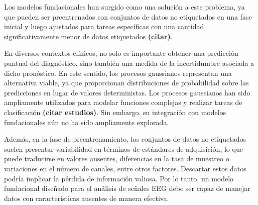 Los modelos fundacionales han surgido como una solución a este problema, ya que pueden ser preentrenados con conjuntos de datos no etiquetados en una fase inicial y luego ajustados para tareas específicas con una cantidad significativamente menor de datos etiquetados \textbf{(citar)}.  

En diversos contextos clínicos, no solo es importante obtener una predicción puntual del diagnóstico, sino también una medida de la incertidumbre asociada a dicho pronóstico. En este sentido, los procesos gaussianos representan una alternativa viable, ya que proporcionan distribuciones de probabilidad sobre las predicciones en lugar de valores deterministas. Los procesos gaussianos han sido ampliamente utilizados para modelar funciones complejas y realizar tareas de clasificación \textbf{(citar estudios)}. Sin embargo, su integración con modelos fundacionales aún no ha sido ampliamente explorada.  

Además, en la fase de preentrenamiento, los conjuntos de datos no etiquetados suelen presentar variabilidad en términos de estándares de adquisición, lo que puede traducirse en valores ausentes, diferencias en la tasa de muestreo o variaciones en el número de canales, entre otros factores. Descartar estos datos podría implicar la pérdida de información valiosa. Por lo tanto, un modelo fundacional diseñado para el análisis de señales EEG debe ser capaz de manejar datos con características ausentes de manera efectiva.  

